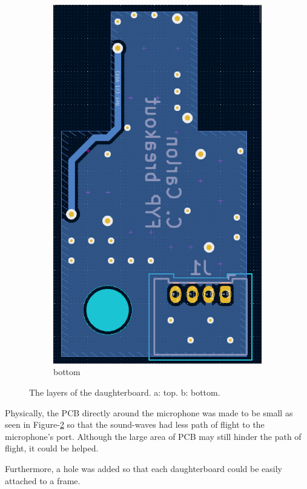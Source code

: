 \documentclass[notitlepage]{report}
\begin{document}
\begin{figure}[H]
\begin{subfigure}{0.5\textwidth}
	\includegraphics[width=.9\textwidth]{./pcb/daughter/bottom.png}
	\centering
	\caption{bottom}
	\label{fig:design_pcb_daughter_bottom}
	\centering
\end{subfigure}
\caption{The layers of the daughterboard. a: top. b: bottom.}
\label{fig:design_pcb_daughter}
\centering
\end{figure}

Physically, the PCB directly around the microphone was made to be small as seen in Figure-\ref{fig:design_pcb_daughter} so that the sound-waves had less path of flight to the microphone's port. Although the large area of PCB may still hinder the path of flight, it could be helped.

Furthermore, a hole was added so that each daughterboard could be easily attached to a frame.
\end{document}
